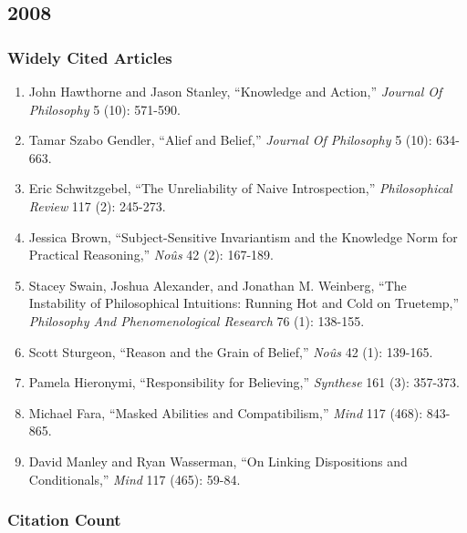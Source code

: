 \documentclass[
  10pt,
  letterpaper,
  DIV=11,
  numbers=noendperiod,
  twoside]{scrartcl}
\providecommand{\tightlist}{%
  \setlength{\itemsep}{0pt}\setlength{\parskip}{0pt}}\usepackage{longtable,booktabs,array}
\begin{document}
\newpage

\subsection{2008}\label{sec-s2008}

\subsubsection*{Widely Cited Articles}\label{widely-cited-articles-32}

\begin{enumerate}
\def\labelenumi{\arabic{enumi}.}
\tightlist
\item
  John Hawthorne and Jason Stanley, ``Knowledge and Action,''
  \emph{Journal Of Philosophy} 5 (10): 571-590.
\item
  Tamar Szabo Gendler, ``Alief and Belief,'' \emph{Journal Of
  Philosophy} 5 (10): 634-663.
\item
  Eric Schwitzgebel, ``The Unreliability of Naive Introspection,''
  \emph{Philosophical Review} 117 (2): 245-273.
\item
  Jessica Brown, ``Subject-Sensitive Invariantism and the Knowledge Norm
  for Practical Reasoning,'' \emph{Noûs} 42 (2): 167-189.
\item
  Stacey Swain, Joshua Alexander, and Jonathan M. Weinberg, ``The
  Instability of Philosophical Intuitions: Running Hot and Cold on
  Truetemp,'' \emph{Philosophy And Phenomenological Research} 76 (1):
  138-155.
\item
  Scott Sturgeon, ``Reason and the Grain of Belief,'' \emph{Noûs} 42
  (1): 139-165.
\item
  Pamela Hieronymi, ``Responsibility for Believing,'' \emph{Synthese}
  161 (3): 357-373.
\item
  Michael Fara, ``Masked Abilities and Compatibilism,'' \emph{Mind} 117
  (468): 843-865.
\item
  David Manley and Ryan Wasserman, ``On Linking Dispositions and
  Conditionals,'' \emph{Mind} 117 (465): 59-84.
\end{enumerate}

\subsubsection*{Citation Count}\label{sec-count-2008}
\end{document}
